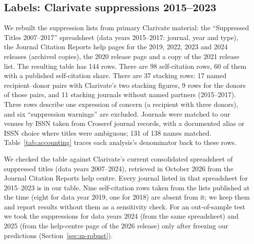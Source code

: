 \subsection{Labels: Clarivate suppressions 2015--2023}
We rebuilt the suppression lists from primary Clarivate material: the ``Suppressed Titles 2007--2017'' spreadsheet
(data years 2015--2017: journal, year and type), the Journal Citation Reports help pages for the 2019, 2022, 2023 and
2024 releases (archived copies), the 2020 release page and a copy of the 2021 release list. The resulting table has 144
rows. There are 98 self-citation rows, 60 of them with a published self-citation share. There are 37 stacking rows:
17 named recipient--donor pairs with Clarivate's two stacking figures, 9 rows for the donors of those pairs, and 11
stacking journals without named partners (2015--2017). Three rows describe one expression of concern (a recipient
with three donors), and six ``suppression warnings'' are excluded. Journals were matched to our venues by ISSN taken
from Crossref journal records, with a documented alias or ISSN choice where titles were ambiguous; 131 of 138 names
matched. Table~\ref{tab:accounting} traces each analysis's denominator back to these rows.

We checked the table against Clarivate's current consolidated spreadsheet of suppressed titles (data years
2007--2024), retrieved in October 2026 from the Journal Citation Reports help centre. Every journal listed in that
spreadsheet for 2015--2023 is in our table. Nine self-citation rows taken from the lists published at the time (eight
for data year 2019, one for 2018) are absent from it; we keep them and report results without them as a sensitivity
check. For an out-of-sample test we took the suppressions for data years 2024 (from the same spreadsheet) and 2025
(from the help-centre page of the 2026 release) only after freezing our predictions (Section~\ref{sec:m-robust}).

